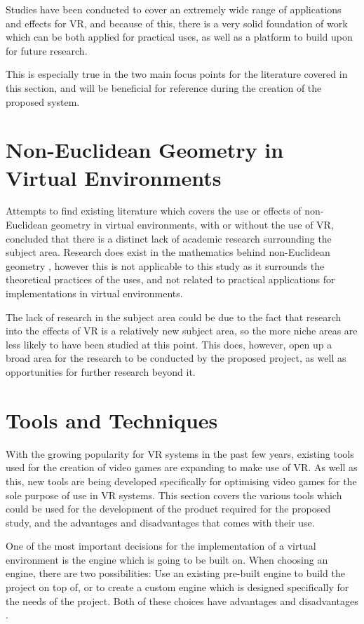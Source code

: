 			Studies have been conducted to cover an extremely wide range of applications and effects for VR, and because of this, there is a very solid foundation of work which can be both applied for practical uses, as well as a platform to build upon for future research.

			This is especially true in the two main focus points for the literature covered in this section, and will be beneficial for reference during the creation of the proposed system.

	\section{Non-Euclidean Geometry in Virtual Environments}
	\label{lr:ne}

		Attempts to find existing literature which covers the use or effects of non-Euclidean geometry in virtual environments, with or without the use of VR, concluded that there is a distinct lack of academic research surrounding the subject area.
		Research does exist in the mathematics behind non-Euclidean geometry \cite{Maric2014} \cite{Turner2009}, however this is not applicable to this study as it surrounds the theoretical practices of the uses, and not related to practical applications for implementations in virtual environments.

		The lack of research in the subject area could be due to the fact that research into the effects of VR is a relatively new subject area, so the more niche areas are less likely to have been studied at this point.
		This does, however, open up a broad area for the research to be conducted by the proposed project, as well as opportunities for further research beyond it.

	\section{Tools and Techniques}
	\label{lr:tools}

		With the growing popularity for VR systems in the past few years, existing tools used for the creation of video games are expanding to make use of VR.
		As well as this, new tools are being developed specifically for optimising video games for the sole purpose of use in VR systems.
		This section covers the various tools which could be used for the development of the product required for the proposed study, and the advantages and disadvantages that comes with their use.

		One of the most important decisions for the implementation of a virtual environment is the engine which is going to be built on.
		When choosing an engine, there are two possibilities: Use an existing pre-built engine to build the project on top of, or to create a custom engine which is designed specifically for the needs of the project.
		Both of these choices have advantages and disadvantages \cite{Bruce2012}.

